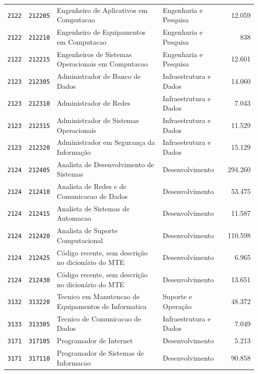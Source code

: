 \begin{quadro}[htbp]
\begin{tabular}{llp{6.0cm}lr}
        \texttt{2122} & \texttt{212205} & Engenheiro de Aplicativos em Computacao & Engenharia e Pesquisa & 12.059 \\
        \texttt{2122} & \texttt{212210} & Engenheiro de Equipamentos em Computacao & Engenharia e Pesquisa & 838 \\
        \texttt{2122} & \texttt{212215} & Engenheiros de Sistemas Operacionais em Computacao & Engenharia e Pesquisa & 12.601 \\
        \texttt{2123} & \texttt{212305} & Administrador de Banco de Dados & Infraestrutura e Dados & 14.060 \\
        \texttt{2123} & \texttt{212310} & Administrador de Redes & Infraestrutura e Dados & 7.043 \\
        \texttt{2123} & \texttt{212315} & Administrador de Sistemas Operacionais & Infraestrutura e Dados & 11.529 \\
        \texttt{2123} & \texttt{212320} & Administrador em Segurança da Informação & Infraestrutura e Dados & 15.129 \\
        \texttt{2124} & \texttt{212405} & Analista de Desenvolvimento de Sistemas & Desenvolvimento & 294.260 \\
        \texttt{2124} & \texttt{212410} & Analista de Redes e de Comunicacao de Dados & Desenvolvimento & 53.475 \\
        \texttt{2124} & \texttt{212415} & Analista de Sistemas de Automacao & Desenvolvimento & 11.587 \\
        \texttt{2124} & \texttt{212420} & Analista de Suporte Computacional & Desenvolvimento & 110.598 \\
        \texttt{2124} & \texttt{212425} & Código recente, sem descrição no dicionário do MTE & Desenvolvimento & 6.965 \\
        \texttt{2124} & \texttt{212430} & Código recente, sem descrição no dicionário do MTE & Desenvolvimento & 13.651 \\
        \texttt{3132} & \texttt{313220} & Tecnico em Manutencao de Equipamentos de Informatica & Suporte e Operação & 48.372 \\
        \texttt{3133} & \texttt{313305} & Tecnico de Comunicacao de Dados & Infraestrutura e Dados & 7.049 \\
        \texttt{3171} & \texttt{317105} & Programador de Internet & Desenvolvimento & 5.213 \\
        \texttt{3171} & \texttt{317110} & Programador de Sistemas de Informacao & Desenvolvimento & 90.858 \\

\end{tabular}
\end{quadro}

